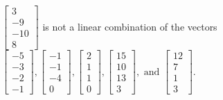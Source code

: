 \begin{exercise}
\begin{exerciseStatement}
  \end{exerciseStatement}
  \begin{exerciseAnswer}
   \(\left[\begin{array}{c}
3 \\
-9 \\
-10 \\
8
\end{array}\right]\) 
  	 is not  
	a linear combination of the vectors \(\left[\begin{array}{c}
-5 \\
-3 \\
-2 \\
-1
\end{array}\right] , \left[\begin{array}{c}
-1 \\
-1 \\
-4 \\
0
\end{array}\right] , \left[\begin{array}{c}
2 \\
1 \\
1 \\
0
\end{array}\right] , \left[\begin{array}{c}
15 \\
10 \\
13 \\
3
\end{array}\right] , \text{ and } \left[\begin{array}{c}
12 \\
7 \\
1 \\
3
\end{array}\right]\).

	
  


  \end{exerciseAnswer}
\end{exercise}